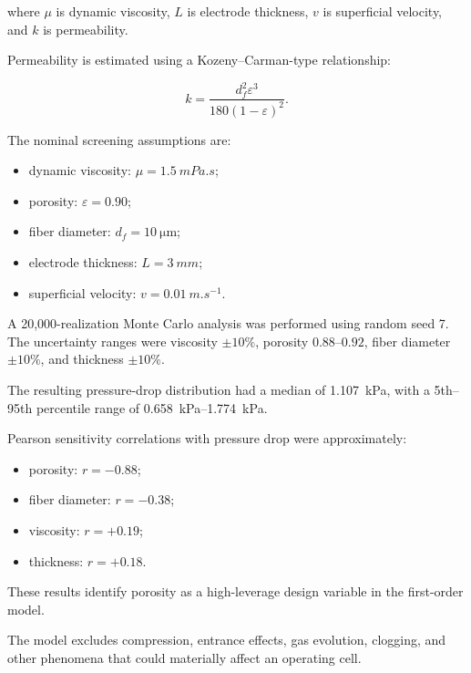 \documentclass[11pt,letterpaper]{article}
\begin{document}
where $\mu$ is dynamic viscosity, $L$ is electrode thickness, $v$ is
superficial velocity, and $k$ is permeability.

Permeability is estimated using a Kozeny--Carman-type relationship:

\begin{equation}
k =
\frac{d_f^2\varepsilon^3}
{180(1-\varepsilon)^2}.
\label{eq:permeability}
\end{equation}

The nominal screening assumptions are:

\begin{itemize}
    \item dynamic viscosity:
    $\mu=\SI{1.5}{mPa.s}$;
    \item porosity:
    $\varepsilon=0.90$;
    \item fiber diameter:
    $d_f=\SI{10}{\micro\meter}$;
    \item electrode thickness:
    $L=\SI{3}{mm}$;
    \item superficial velocity:
    $v=\SI{0.01}{m.s^{-1}}$.
\end{itemize}

A 20,000-realization Monte Carlo analysis was performed using random seed
7. The uncertainty ranges were viscosity $\pm10\%$, porosity
$0.88$--$0.92$, fiber diameter $\pm10\%$, and thickness $\pm10\%$.

The resulting pressure-drop distribution had a median of
\SI{1.107}{kPa}, with a 5th--95th percentile range of
\SIrange{0.658}{1.774}{kPa}.

Pearson sensitivity correlations with pressure drop were approximately:

\begin{itemize}
    \item porosity: $r=-0.88$;
    \item fiber diameter: $r=-0.38$;
    \item viscosity: $r=+0.19$;
    \item thickness: $r=+0.18$.
\end{itemize}

These results identify porosity as a high-leverage design variable in the
first-order model.

The model excludes compression, entrance effects, gas evolution, clogging,
and other phenomena that could materially affect an operating cell.

\end{document}

